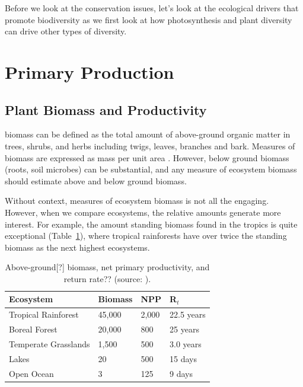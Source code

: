 Before we look at the conservation issues, let's look at the ecological drivers that promote biodiversity as we first look at how photosynthesis and plant diversity can drive other types of diversity. 

\section{Primary Production}

\subsection{Plant Biomass and Productivity}

	
\Gls{biomass} can be defined as the total amount of above-ground organic matter in trees, shrubs, and herbs including twigs, leaves, branches and bark. Measures of biomass are expressed as mass per unit area \citep{brown1991biomass}. However, below ground biomass (roots, soil microbes) can be substantial, and any measure of ecosystem biomass should estimate above and below ground biomass. 

Without context, measures of ecosystem biomass is not all the engaging. However, when we compare ecosystems, the relative amounts generate more interest. For example, the amount standing biomass found in the tropics is quite exceptional (Table~\ref{tab:biomass}), where tropical rainforests have over twice the standing biomass as the next highest ecosystems. 

\begin{table}[htb]
	\centering
	\caption{Above-ground[?] biomass, net primary productivity, and return rate?? (source: \citet{TBD}).}
	\label{tab:biomass}
		\begin{tabular}{llll}\hline
Ecosystem 						& Biomass	& NPP		& R$_t$ \\ \hline\hline

Tropical Rainforest		& 45,000	& 2,000	& 22.5 years \\
Boreal Forest					& 20,000	& 800		& 25 years \\
Temperate Grasslands	& 1,500		& 500		& 3.0 years \\
Lakes									& 20			& 500		& 15 days\\
Open Ocean						& 3				& 125		& 9 days \\ \hline	
		\end{tabular}

\end{table}
	
